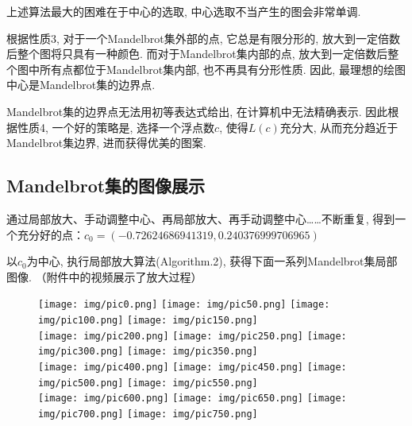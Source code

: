 \documentclass[UTF8]{ctexart}
\begin{document}
上述算法最大的困难在于中心的选取, 中心选取不当产生的图会非常单调. 

根据性质3, 对于一个Mandelbrot集外部的点, 它总是有限分形的, 放大到一定倍数后整个图将只具有一种颜色. 而对于Mandelbrot集内部的点, 放大到一定倍数后整个图中所有点都位于Mandelbrot集内部, 也不再具有分形性质. 因此, 最理想的绘图中心是Mandelbrot集的边界点. 

Mandelbrot集的边界点无法用初等表达式给出, 在计算机中无法精确表示. 因此根据性质4, 一个好的策略是, 选择一个浮点数$c$, 使得$L(c)$充分大, 从而充分趋近于Mandelbrot集边界, 进而获得优美的图案. 

\subsection{Mandelbrot集的图像展示}

通过局部放大、手动调整中心、再局部放大、再手动调整中心……不断重复, 得到一个充分好的点：$c_0=(-0.72624686941319,0.240376999706965)$

以$c_0$为中心, 执行局部放大算法(Algorithm.2), 获得下面一系列Mandelbrot集局部图像. （附件中的视频展示了放大过程）

\begin{figure}[H]
    \centering
    \texttt{[image: img/pic0.png]}
    \texttt{[image: img/pic50.png]}
    \texttt{[image: img/pic100.png]}
    \texttt{[image: img/pic150.png]}
    \\
    \centering
    \vspace{3pt} \texttt{[image: img/pic200.png]}
    \texttt{[image: img/pic250.png]}
    \texttt{[image: img/pic300.png]}
    \texttt{[image: img/pic350.png]}
    \\
    \centering
    \vspace{3pt} \texttt{[image: img/pic400.png]}
    \texttt{[image: img/pic450.png]}
    \texttt{[image: img/pic500.png]}
    \texttt{[image: img/pic550.png]}
    \\
    \centering
    \vspace{3pt} \texttt{[image: img/pic600.png]}
    \texttt{[image: img/pic650.png]}
    \texttt{[image: img/pic700.png]}
    \texttt{[image: img/pic750.png]}
\end{figure}
\end{document}
